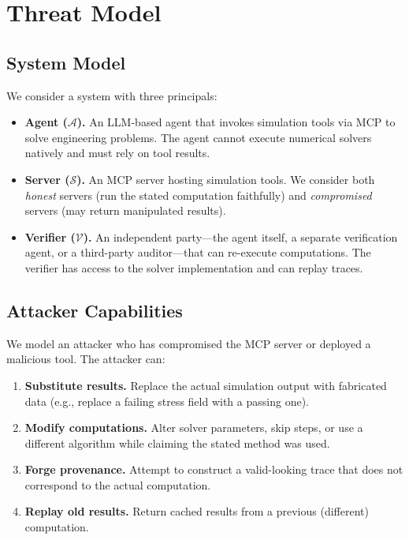 \documentclass[letterpaper,twocolumn,10pt]{article}
\begin{document}

\section{Threat Model}
\label{sec:threat}

\subsection{System Model}

We consider a system with three principals:

\begin{itemize}[nosep,leftmargin=*]
\item \textbf{Agent ($\mathcal{A}$).} An LLM-based agent that invokes
  simulation tools via MCP to solve engineering problems. The agent cannot
  execute numerical solvers natively and must rely on tool results.
\item \textbf{Server ($\mathcal{S}$).} An MCP server hosting simulation
  tools. We consider both \emph{honest} servers (run the stated computation
  faithfully) and \emph{compromised} servers (may return manipulated results).
\item \textbf{Verifier ($\mathcal{V}$).} An independent party---the agent
  itself, a separate verification agent, or a third-party auditor---that can
  re-execute computations. The verifier has access to the solver
  implementation and can replay traces.
\end{itemize}

\subsection{Attacker Capabilities}

We model an attacker who has compromised the MCP server or deployed a
malicious tool. The attacker can:

\begin{enumerate}[nosep,leftmargin=*]
\item \textbf{Substitute results.} Replace the actual simulation output with
  fabricated data (e.g., replace a failing stress field with a passing one).
\item \textbf{Modify computations.} Alter solver parameters, skip steps,
  or use a different algorithm while claiming the stated method was used.
\item \textbf{Forge provenance.} Attempt to construct a valid-looking trace
  that does not correspond to the actual computation.
\item \textbf{Replay old results.} Return cached results from a previous
  (different) computation.
\end{enumerate}
\end{document}
